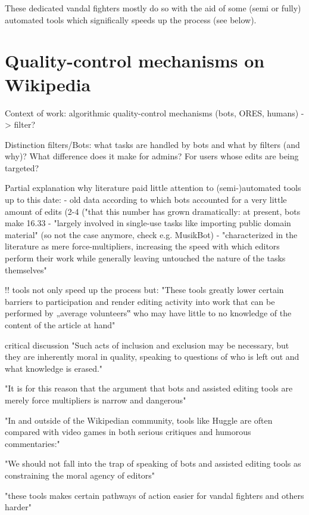 These dedicated vandal fighters mostly do so with the aid of some (semi or fully) automated tools which significally speeds up the process (see below).

\section{Quality-control mechanisms on Wikipedia}
Context of work: algorithmic quality-control mechanisms (bots, ORES, humans) -> filter?

Distinction filters/Bots: what tasks are handled by bots and what by filters (and why)? What difference does it make for admins? For users whose edits are being targeted?

\cite{GeiRib2010}
Partial explanation why literature paid little attention to (semi-)automated tools up to this date:
- old data according to which bots accounted for a very little amount of edits (2-4%
  ("that this number has grown
dramatically: at present, bots make 16.33%
- "largely involved in single-use tasks like importing public domain material" (so not the case anymore, check e.g. MusikBot)
- "characterized in the literature as mere force-multipliers,
increasing the speed with which editors perform their work
while generally leaving untouched the nature of the tasks
themselves"

!! tools not only speed up the process but:
"These tools greatly lower certain barriers to participation and render editing
activity into work that can be performed by „average
volunteers‟ who may have little to no knowledge of the
content of the article at hand"

critical discussion
"Such acts of inclusion and exclusion may be necessary, but
they are inherently moral in quality, speaking to questions of
who is left out and what knowledge is erased."

"It is for
this reason that the argument that bots and assisted editing
tools are merely force multipliers is narrow and dangerous"

"In and outside of the Wikipedian community, tools
like Huggle are often compared with video games in both
serious critiques and humorous commentaries:"

"We should not fall into the trap of speaking of bots and
assisted editing tools as constraining the moral agency of
editors"

"these tools makes certain pathways of action easier for vandal
fighters and others harder"

